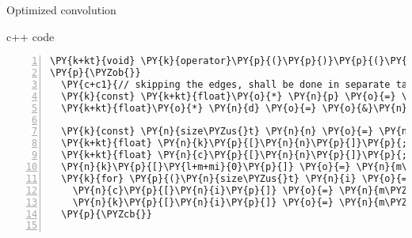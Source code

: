 \documentclass{beamer}
\begin{document}


\begin{frame}[fragile]{Optimized convolution}

\begin{block}{c++ code}

\tiny
\begin{Verbatim}[commandchars=\\\{\},numbers=left,firstnumber=1,stepnumber=1]
\PY{k+kt}{void} \PY{k}{operator}\PY{p}{(}\PY{p}{)}\PY{p}{(}\PY{k}{const} \PY{n}{tbb}\PY{o}{:}\PY{o}{:}\PY{n}{blocked\PYZus{}range}\PY{o}{<}\PY{n}{size\PYZus{}t}\PY{o}{>}\PY{o}{&} \PY{n}{r}\PY{p}{)} \PY{k}{const}
\PY{p}{\PYZob{}}
  \PY{c+c1}{// skipping the edges, shall be done in separate task}
  \PY{k}{const} \PY{k+kt}{float}\PY{o}{*} \PY{n}{p} \PY{o}{=} \PY{o}{&}\PY{n}{m\PYZus{}input}\PY{p}{[}\PY{l+m+mi}{0}\PY{p}{]} \PY{o}{+} \PY{n}{r}\PY{p}{.}\PY{n}{begin}\PY{p}{(}\PY{p}{)}\PY{p}{;}
  \PY{k+kt}{float}\PY{o}{*} \PY{n}{d} \PY{o}{=} \PY{o}{&}\PY{n}{m\PYZus{}output}\PY{p}{[}\PY{l+m+mi}{0}\PY{p}{]} \PY{o}{+} \PY{n}{r}\PY{p}{.}\PY{n}{begin}\PY{p}{(}\PY{p}{)}\PY{p}{;}

  \PY{k}{const} \PY{n}{size\PYZus{}t} \PY{n}{n} \PY{o}{=} \PY{n}{m\PYZus{}kernel}\PY{p}{.}\PY{n}{size}\PY{p}{(}\PY{p}{)}\PY{p}{;}
  \PY{k+kt}{float} \PY{n}{k}\PY{p}{[}\PY{n}{n}\PY{p}{]}\PY{p}{;} \PY{c+c1}{// pre-read kernel}
  \PY{k+kt}{float} \PY{n}{c}\PY{p}{[}\PY{n}{n}\PY{p}{]}\PY{p}{;} \PY{c+c1}{// pre-read values}
  \PY{n}{k}\PY{p}{[}\PY{l+m+mi}{0}\PY{p}{]} \PY{o}{=} \PY{n}{m\PYZus{}kernel}\PY{p}{[}\PY{l+m+mi}{0}\PY{p}{]}\PY{p}{;}
  \PY{k}{for} \PY{p}{(}\PY{n}{size\PYZus{}t} \PY{n}{i} \PY{o}{=} \PY{l+m+mi}{1}\PY{p}{;} \PY{n}{i} \PY{o}{<} \PY{n}{n}\PY{p}{;} \PY{o}{+}\PY{o}{+}\PY{n}{i}\PY{p}{)} \PY{p}{\PYZob{}}
    \PY{n}{c}\PY{p}{[}\PY{n}{i}\PY{p}{]} \PY{o}{=} \PY{n}{m\PYZus{}input}\PY{p}{[}\PY{n}{i}\PY{o}{-}\PY{l+m+mi}{1}\PY{p}{]}\PY{p}{;}
    \PY{n}{k}\PY{p}{[}\PY{n}{i}\PY{p}{]} \PY{o}{=} \PY{n}{m\PYZus{}kernel}\PY{p}{[}\PY{n}{i}\PY{p}{]}\PY{p}{;}
  \PY{p}{\PYZcb{}}


\end{Verbatim}
\end{block}
\end{frame}
\end{document}

